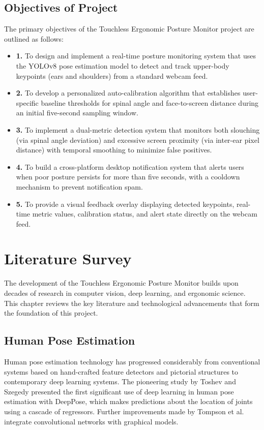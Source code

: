 \documentclass{llncs}
\begin{document}
\subsection{Objectives of Project}
The primary objectives of the Touchless Ergonomic Posture Monitor project are outlined as follows:
\begin{itemize}
    \item \textbf{1.} To design and implement a real-time posture monitoring system that uses the YOLOv8 pose estimation model to detect and track upper-body keypoints (ears and shoulders) from a standard webcam feed.
    \item \textbf{2.} To develop a personalized auto-calibration algorithm that establishes user-specific baseline thresholds for spinal angle and face-to-screen distance during an initial five-second sampling window.
    \item \textbf{3.} To implement a dual-metric detection system that monitors both slouching (via spinal angle deviation) and excessive screen proximity (via inter-ear pixel distance) with temporal smoothing to minimize false positives.
    \item \textbf{4.} To build a cross-platform desktop notification system that alerts users when poor posture persists for more than five seconds, with a cooldown mechanism to prevent notification spam.
    \item \textbf{5.} To provide a visual feedback overlay displaying detected keypoints, real-time metric values, calibration status, and alert state directly on the webcam feed.
\end{itemize}

\section{Literature Survey}

The development of the Touchless Ergonomic Posture Monitor builds upon decades of research in computer vision, deep learning, and ergonomic science. This chapter reviews the key literature and technological advancements that form the foundation of this project.

\subsection{Human Pose Estimation}
Human pose estimation technology has progressed considerably from conventional systems based on hand-crafted feature detectors and pictorial structures to contemporary deep learning systems. The pioneering study by Toshev and Szegedy \cite{deeppose} presented the first significant use of deep learning in human pose estimation with DeepPose, which makes predictions about the location of joints using a cascade of regressors. Further improvements made by Tompson et al. \cite{tompson2014joint} integrate convolutional networks with graphical models.
\end{document}

